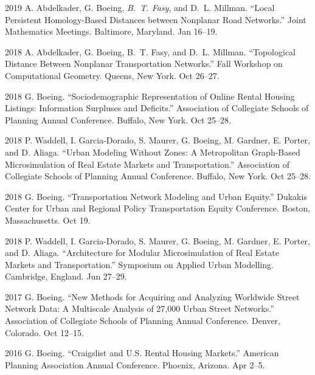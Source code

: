 \documentclass[11pt,letterpaper]{report} %
\begin{document}
\begin{tablist}
        \item[2019] \tab{}A. Abdelkader, G. Boeing, \textit{B.~T. Fasy}, and D.~L. Millman. \enquote{Local Persistent Homology-Based Distances between Nonplanar Road Networks.} Joint Mathematics Meetings. Baltimore, Maryland. Jan 16--19.

        \item[2018] \tab{}A. Abdelkader, G. Boeing, B.~T. Fasy, and D.~L. Millman. \enquote{Topological Distance Between Nonplanar Transportation Networks.} Fall Workshop on Computational Geometry. Queens, New York. Oct 26--27.

        \item[2018] \tab{}G. Boeing. \enquote{Sociodemographic Representation of Online Rental Housing Listings: Information Surpluses and Deficits.} Association of Collegiate Schools of Planning Annual Conference. Buffalo, New York. Oct 25--28.

        \item[2018] \tab{}P. Waddell, I. Garcia-Dorado, S. Maurer, G. Boeing, M. Gardner, E. Porter, and D. Aliaga. \enquote{Urban Modeling Without Zones: A Metropolitan Graph-Based Microsimulation of Real Estate Markets and Transportation.} Association of Collegiate Schools of Planning Annual Conference. Buffalo, New York. Oct 25--28.

        \item[2018] \tab{}G. Boeing. \enquote{Transportation Network Modeling and Urban Equity.} Dukakis Center for Urban and Regional Policy Transportation Equity Conference. Boston, Massachusetts. Oct 19.

        \item[2018] \tab{}P. Waddell, I. Garcia-Dorado, S. Maurer, G. Boeing, M. Gardner, E. Porter, and D. Aliaga. \enquote{Architecture for Modular Microsimulation of Real Estate Markets and Transportation.} Symposium on Applied Urban Modelling. Cambridge, England. Jun 27--29.

        \item[2017] \tab{}G. Boeing. \enquote{New Methods for Acquiring and Analyzing Worldwide Street Network Data: A Multiscale Analysis of 27,000 Urban Street Networks.} Association of Collegiate Schools of Planning Annual Conference. Denver, Colorado. Oct 12--15.

        \item[2016] \tab{}G. Boeing. \enquote{Craigslist and U.S. Rental Housing Markets.} American Planning Association Annual Conference. Phoenix, Arizona. Apr 2--5.


\end{tablist}
\end{document}
